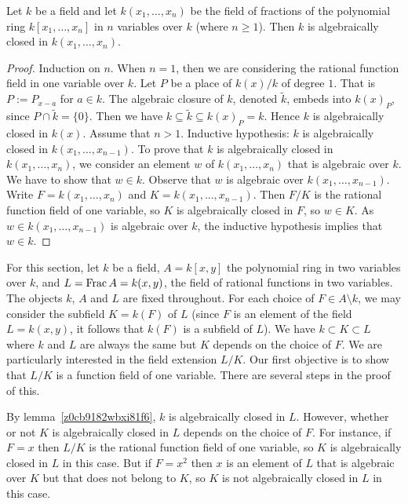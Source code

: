 \begin{lemma} \label {z0cb9182wbxi81f6}
Let $k$ be a field and let $k(x_1, \dots, x_n)$ be 
the field of fractions of the
polynomial ring  $k[x_1, \dots, x_n]$ in $n$ variables 
over $k$ (where $n \ge 1$).
Then $k$ is algebraically closed in $k(x_1, \dots, x_n)$.
\end{lemma}

\begin{proof}
Induction on $n$. When $n= 1$, then we are considering 
the rational function field in one variable over $k $.
Let $P$ be a place of $k(x)/k$ of degree $1$. That is
$P:=P_{x-a}$ for $a \in k$. The algebraic closure of 
$k$, denoted $\tilde{k}$, embeds into $k(x)_P$, since 
$P \cap \tilde{k} = \lbrace 0 \rbrace$. Then we have 
$k \subseteq \tilde{k} \subseteq k(x)_P = k$. 
Hence $k$ is algebraically closed in $k(x)$. 
Assume that $n>1$.
Inductive hypothesis: $k$ is algebraically closed 
in $k(x_1, \dots, x_{n-1})$.
To prove that $k$ is algebraically closed in $k(x_1, \dots, x_n)$, we consider
an element $w$ of $k(x_1, \dots, x_n)$ that is algebraic 
over $k$. We have to show that $w \in k$.
Observe that $w$ is algebraic over $k(x_1, \dots, x_{n-1})$.
Write $F = k(x_1, \dots, x_{n})$ and $K = k(x_1, \dots, x_{n-1})$.
Then $F/K$ is the rational function field of one variable, 
so $K$ is algebraically closed in $F$, so $w \in K$.
As $w \in k(x_1, \dots, x_{n-1})$ is algebraic over $k$, 
the inductive hypothesis implies that $w \in k$.
\end{proof}



For this section, let $ k$ be a field, $A =  k[x,y]$ 
the polynomial ring in two variables over $ k$,
and $L= \operatorname{{\rm Frac}} A =  k(x,y)$, the field of rational functions in two variables.
The objects $ k$, $A$ and $L$ are fixed throughout.
For each choice of $F \in A \setminus  k$, 
we may consider the subfield $K= k(F)$ of $L$
(since $F$ is an element of the field $L =  k(x,y)$, 
it follows that $ k(F)$ is a subfield of $L$).
We have $ k \subset K \subset L$ where $ k$ 
and $L$ are always the same but $K$ depends on the choice of $F$.
We are particularly interested in the field extension $L/K$.
Our first objective is to show that $L/K$ is a function field 
of one variable.
There are several steps in the proof of this.

\begin{remark}
By lemma~\ref{z0cb9182wbxi81f6}, $ k$ is algebraically closed in $L$.
However, whether or not $K$ is algebraically closed in $L$ depends on the choice of $F$.
For instance, if $F=x$ then $L/K$ is the rational function field of one variable, so $K$ is algebraically closed 
in $L$ in this case.  But if $F = x^2$ then $x$ is an element of $L$ that is algebraic over $K$ but that does not 
belong to $K$, so $K$ is not algebraically closed in $L$ in this case.
\end{remark}


